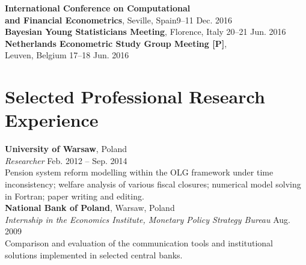 \documentclass[margin,line]{resume}
\begin{document}
\begin{resume}
    \textbf{ International Conference on Computational \\ and Financial Econometrics},  Seville, Spain\hfill 9--11 Dec. 2016  \vspace{1mm} \\ 
	\textbf{ Bayesian Young Statisticians Meeting}, Florence, Italy \hfill 20--21 Jun. 2016  \vspace{1mm} \\ 
	\textbf{ Netherlands Econometric Study Group Meeting [P]},\\
    Leuven, Belgium \hfill 17--18 Jun. 2016  \vspace{1mm} \\ 
  
\vspace{-5mm}

\section{\mysidestyle Selected Professional Research Experience}
\textbf{University of Warsaw}, Poland \vspace{0mm}\\
\textsl{Researcher} \hfill Feb. 2012 -- Sep. 2014\\
Pension system reform modelling within the OLG framework under time inconsistency; welfare analysis of various fiscal closures; numerical model solving in Fortran; paper writing and editing.\vspace{1.5mm} \\
\textbf{National Bank of Poland}, Warsaw, Poland \\
\textsl{Internship in the Economics Institute, Monetary Policy Strategy Bureau} \hfill Aug. 2009\\
Comparison and evaluation of the communication tools and institutional solutions implemented in selected central banks.  



\end{resume}
\end{document}
